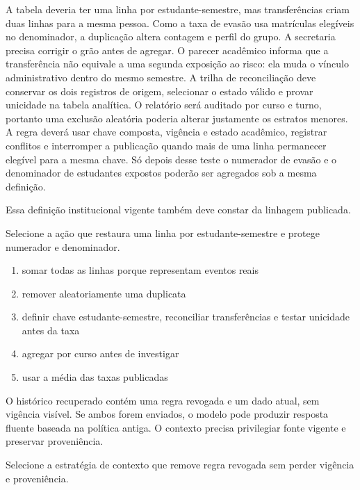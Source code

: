 \documentclass[12pt,a4paper]{article}
\begin{document}
A tabela deveria ter uma linha por estudante-semestre, mas transferências criam duas linhas para a mesma pessoa. Como a taxa de evasão usa matrículas elegíveis no denominador, a duplicação altera contagem e perfil do grupo. A secretaria precisa corrigir o grão antes de agregar. O parecer acadêmico informa que a transferência não equivale a uma segunda exposição ao risco: ela muda o vínculo administrativo dentro do mesmo semestre. A trilha de reconciliação deve conservar os dois registros de origem, selecionar o estado válido e provar unicidade na tabela analítica. O relatório será auditado por curso e turno, portanto uma exclusão aleatória poderia alterar justamente os estratos menores. A regra deverá usar chave composta, vigência e estado acadêmico, registrar conflitos e interromper a publicação quando mais de uma linha permanecer elegível para a mesma chave. Só depois desse teste o numerador de evasão e o denominador de estudantes expostos poderão ser agregados sob a mesma definição.

Essa definição institucional vigente também deve constar da linhagem publicada.

\FonteDidatica

\Comando Selecione a ação que restaura uma linha por estudante-semestre e protege numerador e denominador.

\begin{enumerate}[label=\Alph*)]
  \item somar todas as linhas porque representam eventos reais
  \item remover aleatoriamente uma duplicata
  \item definir chave estudante-semestre, reconciliar transferências e testar unicidade antes da taxa
  \item agregar por curso antes de investigar
  \item usar a média das taxas publicadas
\end{enumerate}


\TextoBase

O histórico recuperado contém uma regra revogada e um dado atual, sem vigência visível. Se ambos forem enviados, o modelo pode produzir resposta fluente baseada na política antiga. O contexto precisa privilegiar fonte vigente e preservar proveniência.

\FonteDidatica

\Comando Selecione a estratégia de contexto que remove regra revogada sem perder vigência e proveniência.
\end{document}
